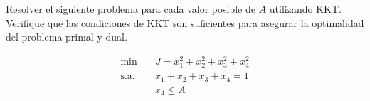 Resolver el siguiente problema para cada valor posible de $A$ utilizando KKT. Verifique que las condiciones de KKT son suficientes para asegurar la optimalidad del problema primal y dual.

\[
\begin{aligned}
\min \quad & J = x_1^2 + x_2^2 + x_3^2 + x_4^2 \\
\text{s.a.} \quad & x_1 + x_2 + x_3 + x_4 = 1 \\
& x_4 \leq A
\end{aligned}
\]
